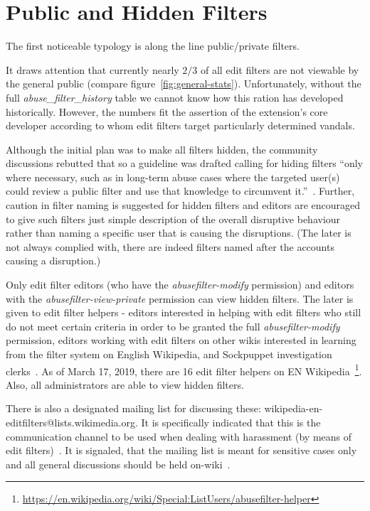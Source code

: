 
\section{Public and Hidden Filters}

The first noticeable typology is along the line public/private filters.

It draws attention that currently nearly $2/3$ of all edit filters are not viewable by the general public (compare figure~\ref{fig:general-stats}).
Unfortunately, without the full \emph{abuse\_filter\_history} table we cannot know how this ration has developed historically.
However, the numbers fit the assertion of the extension's core developer according to whom edit filters target particularly determined vandals.

Although the initial plan was to make all filters hidden, the community discussions rebutted that so a guideline was drafted calling for
hiding filters ``only where necessary, such as in long-term abuse cases where the targeted user(s) could review a public filter and use that knowledge to circumvent it.''~\cite{Wikipedia:EditFilter}.
Further, caution in filter naming is suggested for hidden filters and editors are encouraged to give such filters just simple description of the overall disruptive behaviour rather than naming a specific user that is causing the disruptions.
(The later is not always complied with, there are indeed filters named after the accounts causing a disruption.)

Only edit filter editors (who have the \emph{abusefilter-modify} permission) and editors with the \emph{abusefilter-view-private} permission can view hidden filters.
The later is given to edit filter helpers - editors interested in helping with edit filters who still do not meet certain criteria in order to be granted the full \emph{abusefilter-modify} permission, editors working with edit filters on other wikis interested in learning from the filter system on English Wikipedia, and Sockpuppet investigation clerks~\cite{Wikipedia:EditFilterHelper}.
As of March 17, 2019, there are 16 edit filter helpers on EN Wikipedia~\footnote{\url{https://en.wikipedia.org/wiki/Special:ListUsers/abusefilter-helper}}.
Also, all administrators are able to view hidden filters.

There is also a designated mailing list for discussing these: wikipedia-en-editfilters@lists.wikimedia.org.
It is specifically indicated that this is the communication channel to be used when dealing with harassment (by means of edit filters)~\cite{Wikipedia:EditFilter}.
It is signaled, that the mailing list is meant for sensitive cases only and all general discussions should be held on-wiki~\cite{Wikipedia:EditFilter}.


